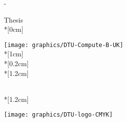 \thispagestyle{empty}             %
\calccentering{\unitlength}
\begin{adjustwidth*}{\unitlength}{-\unitlength}
    \begin{adjustwidth}{-0.5cm}{-0.5cm}
        \sffamily
        \begin{flushright}
            \thesistypeabbr{} Thesis\\*[0cm]
            \thesistype{}\\
        \end{flushright}
        \vspace*{\fill}
        \noindent
        \texttt{[image: graphics/DTU-Compute-B-UK]}\\*[1cm]
        \Huge \thesistitle{}\\*[0.2cm]
        \LARGE \thesissubtitle{}\\*[1.2cm]
        \parbox[b]{0.5\linewidth}{%
            \large \thesisauthor{}\\*[1.2cm]
            \small \thesislocation{} \thesisyear{}\\
            \small \thesisnumber{}
        }
        \hfill\texttt{[image: graphics/DTU-logo-CMYK]}
    \end{adjustwidth}
\end{adjustwidth*}
\normalfont
\normalsize
